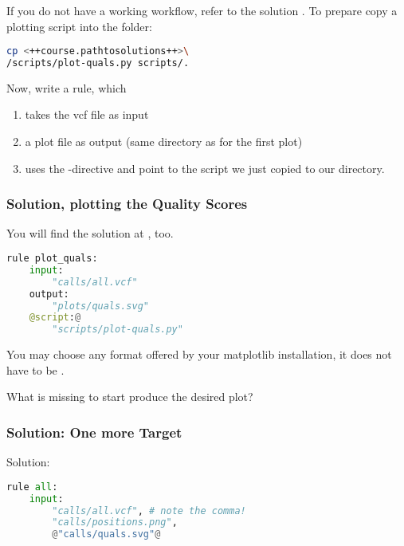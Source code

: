 \begin{frame}[fragile]
	\frametitle{}
	If you do not have a working workflow, refer to the solution .\newline
	To prepare copy a plotting script into the  folder:
	\begin{lstlisting}[language=Bash, style=Shell, basicstyle=\footnotesize]
cp <++course.pathtosolutions++>\
/scripts/plot-quals.py scripts/.
    \end{lstlisting}
    Now, write a rule, which
    \begin{enumerate}
    	\item takes the vcf file as input
    	\item a plot file as output (same directory as for the first plot)
    	\item uses the \altverb{script}-directive and point to the script we just copied to our  directory.
    \end{enumerate}
\end{frame}

\begin{frame}[fragile]
  \frametitle{Solution, plotting the Quality Scores}
  You will find the solution at , too.
  \begin{lstlisting}[language=Python,style=Python]
rule plot_quals:
    input:
        "calls/all.vcf"
    output:
        "plots/quals.svg"
    @script:@
        "scripts/plot-quals.py"
  \end{lstlisting}
  \begin{hint}
  	You may choose any format offered by your matplotlib installation, it does not have to be .
  \end{hint}
  \pause
  \begin{question}
  	What is missing to start produce the desired plot?
  \end{question}
\end{frame}

\begin{frame}[fragile]
	\frametitle{Solution: One more Target}
	
	Solution:
	\begin{lstlisting}[language=Python,style=Python]
rule all:
    input:
        "calls/all.vcf", # note the comma!
        "calls/positions.png",
        @"calls/quals.svg"@
	\end{lstlisting}
\end{frame}

